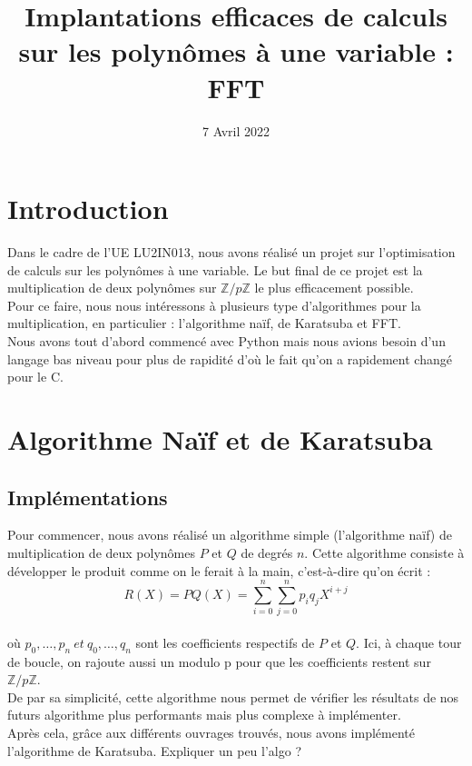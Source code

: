 \documentclass[12pt, a4paper]{article}
\title{Implantations efficaces de calculs sur les polynômes à une variable : FFT}
\author{}
\date{7 Avril 2022}
\begin{document}
\maketitle
\tableofcontents
\newpage

\section*{Introduction}
Dans le cadre de l'UE LU2IN013, nous avons réalisé un projet sur l'optimisation de calculs sur les polynômes à une variable. Le but final de ce projet est la multiplication de deux polynômes sur $\mathbb{Z}/p\mathbb{Z}$ le plus efficacement possible.\\
Pour ce faire, nous nous intéressons à plusieurs type d'algorithmes pour la multiplication, en particulier : l'algorithme naïf, de Karatsuba et FFT.\\
Nous avons tout d'abord commencé avec Python mais nous avions besoin d'un langage bas niveau pour plus de rapidité d'où le fait qu'on a rapidement changé pour le C.

\section{Algorithme Naïf et de Karatsuba}
\subsection{Implémentations}
Pour commencer, nous avons réalisé un algorithme simple (l'algorithme naïf) de multiplication de deux polynômes $P$ et $Q$ de degrés $n$. Cette algorithme consiste à développer le produit comme on le ferait à la main, c'est-à-dire qu'on écrit : \\
\[R(X) = PQ(X) =
\displaystyle\sum_{i=0}^{n}\sum_{j=0}^{n} p_i q_j X^{i+j}\] \\
où $p_0,\dots,p_n\ et\ q_0,\dots,q_n$ sont les coefficients respectifs de $P$ et $Q$. Ici, à chaque tour de boucle, on rajoute aussi un modulo p pour que les coefficients restent sur $\mathbb{Z}/p\mathbb{Z}$.\\
De par sa simplicité, cette algorithme nous permet de vérifier les résultats de nos futurs algorithme plus performants mais plus complexe à implémenter.\\
Après cela, grâce aux différents ouvrages 
trouvés, nous avons implémenté l'algorithme de Karatsuba. Expliquer un peu l'algo ?
\end{document}

